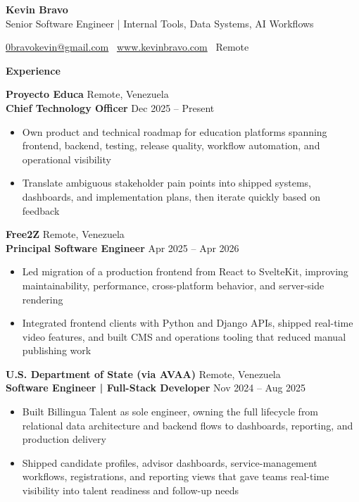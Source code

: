 \documentclass[11pt]{article}
\begin{document}
\begin{center}
    {\LARGE \textbf{Kevin Bravo}}\\
    Senior Software Engineer | Internal Tools, Data Systems, AI Workflows \\
    \hrulefill
\end{center}

\begin{center}
    \href{mailto:0bravokevin@gmail.com}{0bravokevin@gmail.com} \textbullet\ \href{http://www.kevinbravo.com}{www.kevinbravo.com} \textbullet\ Remote
\end{center}

\vspace{0.5pt}

\begin{center}
    \textbf{Experience}
\end{center}
\textbf{Proyecto Educa} \hfill Remote, Venezuela \\
\textbf{Chief Technology Officer} \hfill Dec 2025 -- Present
\begin{itemize}
    \item Own product and technical roadmap for education platforms spanning frontend, backend, testing, release quality, workflow automation, and operational visibility
    \item Translate ambiguous stakeholder pain points into shipped systems, dashboards, and implementation plans, then iterate quickly based on feedback
\end{itemize}

\vspace{12pt}

\textbf{Free2Z} \hfill Remote, Venezuela \\
\textbf{Principal Software Engineer} \hfill Apr 2025 -- Apr 2026
\begin{itemize}
    \item Led migration of a production frontend from React to SvelteKit, improving maintainability, performance, cross-platform behavior, and server-side rendering
    \item Integrated frontend clients with Python and Django APIs, shipped real-time video features, and built CMS and operations tooling that reduced manual publishing work
\end{itemize}

\vspace{12pt}

\textbf{U.S. Department of State (via AVAA)} \hfill Remote, Venezuela \\
\textbf{Software Engineer | Full-Stack Developer} \hfill Nov 2024 -- Aug 2025
\begin{itemize}
    \item Built Billingua Talent as sole engineer, owning the full lifecycle from relational data architecture and backend flows to dashboards, reporting, and production delivery
    \item Shipped candidate profiles, advisor dashboards, service-management workflows, registrations, and reporting views that gave teams real-time visibility into talent readiness and follow-up needs
\end{itemize}
\end{document}
